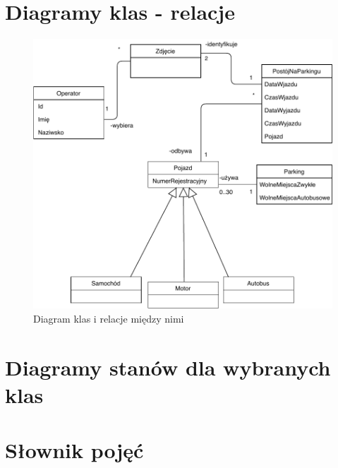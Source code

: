
\section{Diagramy klas  - relacje}
\label{sec:diagKlas}
\begin{figure}[H]
	\centering
	\includegraphics[width=150mm]{diagramy/DiagKlas.pdf}
	\caption{Diagram klas i relacje między nimi \label{overflow}}
\end{figure}



\section{Diagramy stanów dla wybranych klas}
\label{sec:diagStanow}




\section{Słownik pojęć}
\label{sec:slownik}

